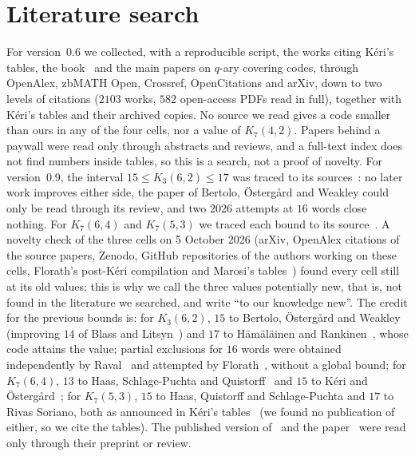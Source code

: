\documentclass[11pt]{amsart}
\theoremstyle{definition}
\theoremstyle{remark}
\begin{document}
\section{Literature search}\label{sec:lit}
For version~0.6 we collected, with a reproducible script, the works citing Kéri's tables, the book~\cite{cohen1997} and the main papers on $q$-ary covering codes, through OpenAlex, zbMATH Open, Crossref, OpenCitations and arXiv, down to two levels of citations ($2103$ works, $582$ open-access PDFs read in full), together with Kéri's tables and their archived copies.
No source we read gives a code smaller than ours in any of the four cells, nor a value of $K_7(4,2)$.
Papers behind a paywall were read only through abstracts and reviews, and a full-text index does not find numbers inside tables, so this is a search, not a proof of novelty.
For version~0.9, the interval $15\le K_3(6,2)\le 17$ was traced to its sources~\cite{bow2004,hr1991}: no later work improves either side, the paper of Bertolo, Östergård and Weakley could only be read through its review, and two 2026 attempts at $16$ words close nothing. For $K_7(6,4)$ and $K_7(5,3)$ we traced each bound to its source~\cite{hsq2009,ko2005,keri}. A novelty check of the three cells on 5 October 2026 (arXiv, OpenAlex citations of the source papers, Zenodo, GitHub repositories of the authors working on these cells, Florath's post-Kéri compilation and Marosi's tables~\cite{marosi2026}) found every cell still at its old values; this is why we call the three values potentially new, that is, not found in the literature we searched, and write ``to our knowledge new''. The credit for the previous bounds is: for $K_3(6,2)$, $15$ to Bertolo, Östergård and Weakley~\cite{bow2004} (improving $14$ of Blass and Litsyn~\cite{bl1998}) and $17$ to Hämäläinen and Rankinen~\cite{hr1991}, whose code attains the value; partial exclusions for $16$ words were obtained independently by Raval~\cite{raval2026} and attempted by Florath~\cite{florath2026}, without a global bound; for $K_7(6,4)$, $13$ to Haas, Schlage-Puchta and Quistorff~\cite{hsq2009} and $15$ to Kéri and Östergård~\cite{ko2005}; for $K_7(5,3)$, $15$ to Haas, Quistorff and Schlage-Puchta and $17$ to Rivas Soriano, both as announced in Kéri's tables~\cite{keri} (we found no publication of either, so we cite the tables). The published version of~\cite{hsq2009} and the paper~\cite{ko2005} were read only through their preprint or review.
\end{document}
